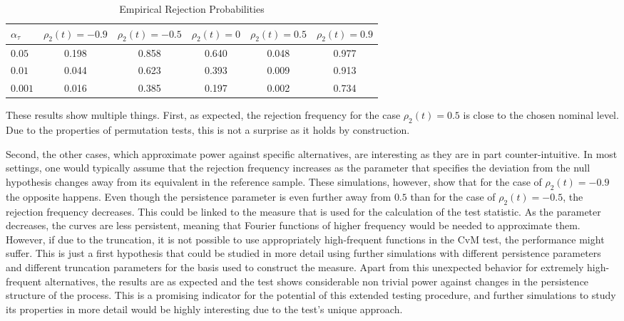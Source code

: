\documentclass[12pt, a4paper]{article}
\theoremstyle{MAstyle} \newtheorem{assumption}{Assumption}[section]
\theoremstyle{MAstyle} \newtheorem{definition}{Definition}[section]
\theoremstyle{MAstyle} \newtheorem{theorem}{Theorem}[section]
\begin{document}
		\begin{table}[H]
			\centering
			\begin{tabular}{l|ccccc}\toprule
				$\alpha_{\tau}$ &$\rho_2(t) = -0.9$ &$\rho_2(t) = -0.5$ &$\rho_2(t) = 0$ &$\rho_2(t) = 0.5$ &$\rho_2(t) = 0.9$\\
				\midrule
				$0.05$	& 0.198 & 0.858  &  0.640 & 0.048   & 0.977  \\
				$0.01$ 	& 0.044	& 0.623  &  0.393 & 0.009   & 0.913  \\
				$0.001$	& 0.016	& 0.385  &  0.197 & 0.002   & 0.734  \\
				\bottomrule
			\end{tabular}
			\caption{Empirical Rejection Probabilities}
			\label{rej_probs_cor}
		\end{table}
		These results show multiple things. First, as expected, the rejection frequency for the case $\rho_2(t) = 0.5$ is close to the chosen nominal level. Due to the properties of permutation tests, this is not a surprise as it holds by construction. 
		
		Second, the other cases, which approximate power against specific alternatives, are interesting as they are in part counter-intuitive.		
		In most settings, one would typically assume that the rejection frequency increases as the parameter that specifies the deviation from the null hypothesis changes away from its equivalent in the reference sample. These simulations, however, show that for the case of $\rho_2(t) = -0.9$ the opposite happens. Even though the persistence parameter is even further away from $0.5$ than for the case of $\rho_2(t) = -0.5$, the rejection frequency decreases. This could be linked to the measure that is used for the calculation of the test statistic. As the parameter decreases, the curves are less persistent, meaning that Fourier functions of higher frequency would be needed to approximate them. However, if due to the truncation, it is not possible to use appropriately high-frequent functions in the CvM test, the performance might suffer. This is just a first hypothesis that could be studied in more detail using further simulations with different persistence parameters and different truncation parameters for the basis used to construct the measure.
		Apart from this unexpected behavior for extremely high-frequent alternatives, the results are as expected and the test shows considerable non trivial power against changes in the persistence structure of the process. This is a promising indicator for the potential of this extended testing procedure, and further simulations to study its properties in more detail would be highly interesting due to the test's unique approach.
				
\end{document}
